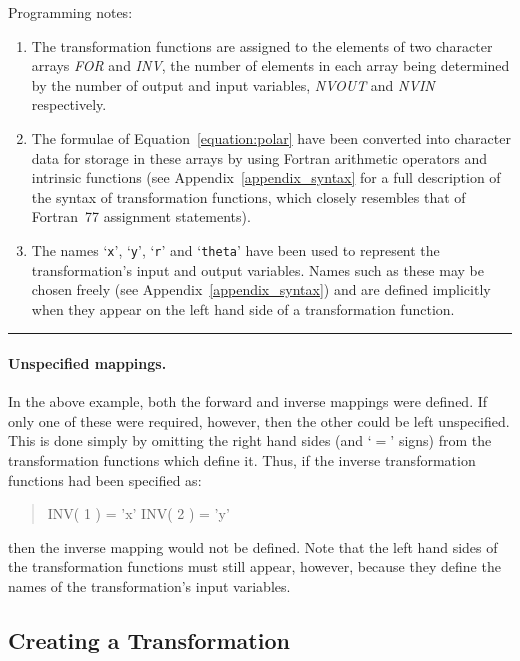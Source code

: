 \documentclass[twoside,nolof,11pt]{starlink}
\providecommand{\fortvar}[1]{\emph{#1}}
\providecommand{\exampledone}[0]{\begin{center} \rule{6em}{0.2mm} \end{center}}
\begin{document}
Programming notes:

\begin{enumerate}

\item  The transformation functions are assigned to the elements of two
character arrays \fortvar{FOR} and \fortvar{INV}, the number of elements in
each array being determined by the number of output and input variables,
\fortvar{NVOUT} and \fortvar{NVIN} respectively.

\item The formulae of Equation~\ref{equation:polar} have been converted into
character data for storage in these arrays by using Fortran arithmetic
operators and intrinsic functions (see Appendix~\ref{appendix_syntax} for a
full description of the syntax of transformation functions, which closely
resembles that of Fortran~77 assignment statements).

\item The names `\verb#x#', `\verb#y#', `\verb#r#' and `\verb#theta#' have
been used to represent the transformation's input and output variables.
Names such as these may be chosen freely (see
Appendix~\ref{appendix_syntax}) and are defined implicitly when they appear
on the left hand side of a transformation function.

\end{enumerate}
\exampledone

\paragraph{Unspecified mappings.}
In the above example, both the forward and inverse mappings were defined.
If only one of these were required, however, then the other could be left
unspecified.
This is done simply by omitting the right hand sides (and `$=$' signs) from
the transformation functions which define it.
Thus, if the inverse transformation functions had been specified as:

\begin{quote}
\begin{terminalv}
INV( 1 ) = 'x'
INV( 2 ) = 'y'
\end{terminalv}
\end{quote}

then the inverse mapping would not be defined.
Note that the left hand sides of the transformation functions must still
appear, however, because they define the names of the transformation's input
variables.


\subsection{Creating a Transformation}
\label{section:simple:creating}
\end{document}
